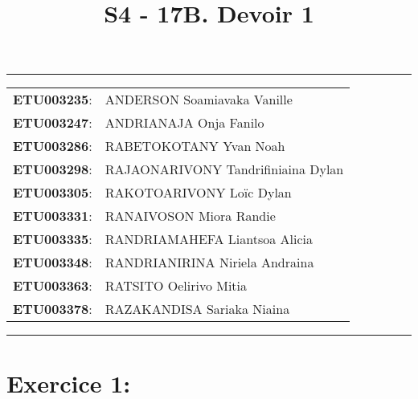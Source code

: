 \documentclass[a4paper,12pt]{article}
\begin{document}
	
\title{\textbf{S4 - 17B. Devoir 1}}
\date{}
\maketitle

\hrule
\vspace{1em}

\begin{tabular}{rl}
	\textbf{ETU003235}: & ANDERSON Soamiavaka Vanille \\
	\textbf{ETU003247}: & ANDRIANAJA Onja Fanilo \\
	\textbf{ETU003286}: & RABETOKOTANY Yvan Noah \\
	\textbf{ETU003298}: & RAJAONARIVONY Tandrifiniaina Dylan \\
	\textbf{ETU003305}: & RAKOTOARIVONY Loïc Dylan \\
	\textbf{ETU003331}: & RANAIVOSON Miora Randie \\
	\textbf{ETU003335}: & RANDRIAMAHEFA Liantsoa Alicia \\
	\textbf{ETU003348}: & RANDRIANIRINA Niriela Andraina \\
	\textbf{ETU003363}: & RATSITO Oelirivo Mitia \\
	\textbf{ETU003378}: & RAZAKANDISA Sariaka Niaina \\
\end{tabular}

\vspace{1em}
\hrule

\newpage
\section*{Exercice 1:}
\end{document}
